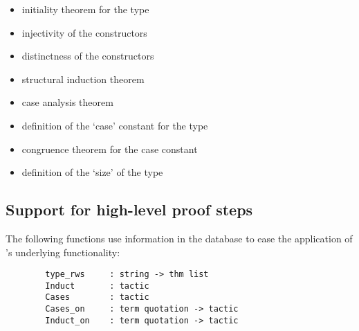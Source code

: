 \begin{itemize}
\item initiality theorem for the type
\item injectivity of the constructors
\item distinctness of the constructors
\item structural induction theorem
\item case analysis theorem
\item definition of the `case' constant for the type
\item congruence theorem for the case constant
\item definition of the `size' of the type
\end{itemize}

\subsection{Support for high-level proof steps}

The following functions use information in the database to ease the
application of \holn{}'s underlying functionality:

\begin{verbatim}
        type_rws     : string -> thm list
        Induct       : tactic
        Cases        : tactic
        Cases_on     : term quotation -> tactic
        Induct_on    : term quotation -> tactic
\end{verbatim}

